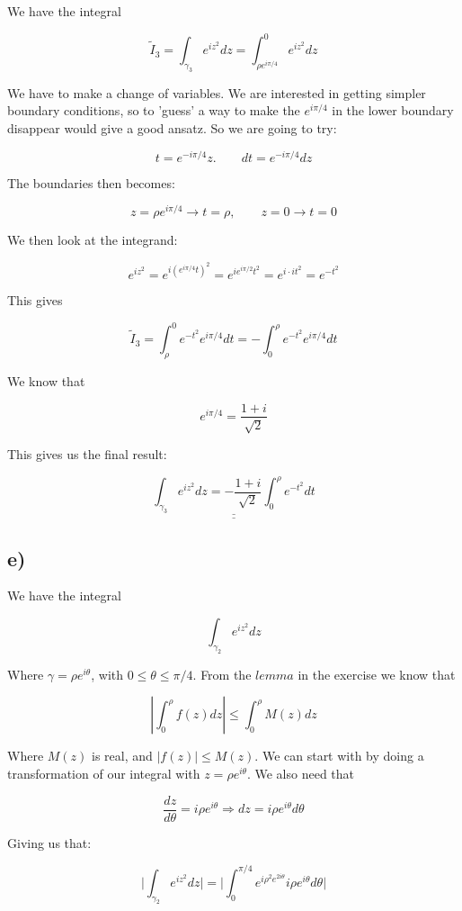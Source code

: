 \documentclass[a4paper,norsk, 10pt]{article}
\begin{document}
We have the integral

$$
\tilde{I}_ 3 = \int_{\gamma_3}e^{iz^2} dz = \int_{\rho e^{i\pi/4}}^0 e^{iz^2} dz 
$$

We have to make a change of variables. We are interested in getting simpler boundary conditions, so to 'guess' a way to make the $e^{i\pi/4}$ in the lower boundary disappear would give a good ansatz. So we are going to try:

$$
t = e^{-i\pi/4}z. \qquad dt = e^{-i\pi /4}dz
$$

The boundaries then becomes:

$$
z = \rho e^{i\pi/4} \rightarrow t = \rho, \qquad z = 0 \rightarrow t = 0
$$

We then look at the integrand:

$$
e^{iz^2} = e^{i(e^{i\pi/4}t)^2} = e^{ie^{i\pi/2}t^2} = e^{i\cdot it^2} = e^{-t^2}
$$

This gives 

$$
\tilde{I}_3 = \int_{\rho}^0 e^{-t^2} e^{i\pi /4} dt = - \int_0^{\rho} e^{-t^2} e^{i\pi /4} dt
$$

We know that 

$$
e^{i\pi/4} =\frac{1+i}{\sqrt{2}}
$$

This gives us the final result:

\begin{equation}
\underline{\underline{\int_{\gamma_3}e^{iz^2} dz = -\frac{1+i}{\sqrt{2}}\int_0^{\rho}e^{-t^2}dt}}
\label{eq:I3}
\end{equation}



\subsection*{e)}
We have the integral

$$
\int_{\gamma_2}e^{iz^2} dz
$$

Where $\gamma = \rho e^{i\theta}$, with $0 \leq \theta \leq \pi/4$. From the $lemma$ in the exercise we know that

$$
|\int_0^{\rho} f(z) dz| \leq \int_0^{\rho} M(z) dz
$$

Where $M(z)$ is real, and $|f(z)| \leq M(z)$. We can start with by doing a transformation of our integral with $z = \rho e^{i\theta}$. We also need that

$$
\frac{dz}{d\theta} = i\rho e^{i\theta} \Rightarrow dz = i\rho e^{i\theta} d\theta
$$

Giving us that:

$$
\big| \int_{\gamma_2}e^{iz^2} dz \big| = \big|\int_0^{\pi/4} e^{i\rho^2 e^{2i\theta}} i\rho e^{i\theta} d\theta \big|
$$
\end{document}
